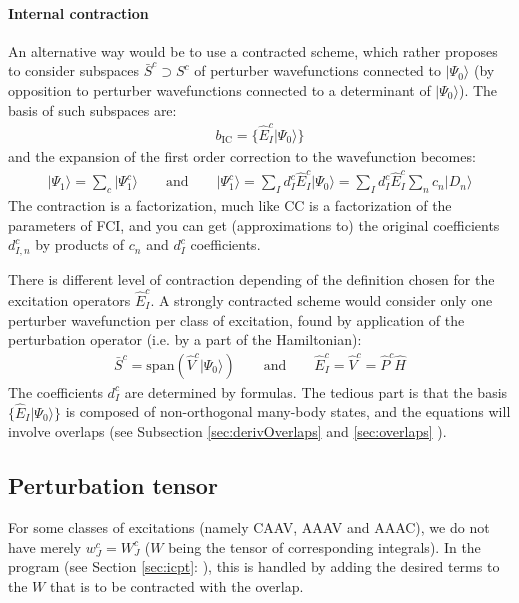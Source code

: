 \documentclass{article}
\newcommand  \equ[2]       {\begin{align}#2\label{#1}\end{align}}
\newcommand  \ket[1]       {\vert #1  \rangle}
\begin{document}
\paragraph{Internal contraction}
\label{sec:contraction}

An alternative way would be to use a contracted scheme, which rather proposes to consider subspaces $\bar{S}^c\supset S^c$ of perturber wavefunctions connected to $\ket{\Psi_0}$ (by opposition to perturber wavefunctions connected to a determinant of $\ket{\Psi_0}$). The basis of such subspaces are:
\equ{ }{
  b_\text{IC}=\{\hat{E}_{I}^c\ket{\Psi_0}\}
}
and the expansion of the first order correction to the wavefunction becomes:
\equ{}{
  \ket{\Psi_1}=\sum_{c}\ket{\Psi_1^c}\qquad\text{and}\qquad \ket{\Psi_1^c}=\sum_{I } d^c_I \hat{E}^c_{I}\ket{\Psi_0}=\sum_{I } d^c_I \hat{E}^c_{I}\sum_n c_n\ket{D_n}}
The contraction is a factorization, much like CC is a factorization of the parameters of FCI, and you can get (approximations to) the original coefficients $d^c_{I,n} $ by products of $c_n$ and $d^c_I$ coefficients.

There is different level of contraction depending of the definition chosen for the excitation operators $\hat{E}_I^c$. A strongly contracted scheme would consider only one perturber wavefunction per class of excitation, found by application of the perturbation operator (i.e. by a part of the Hamiltonian):
\equ{}{
  \bar{S}^c=\text{span}(\hat{V}^c\ket{\Psi_0})
  \qquad\text{and}\qquad
  \hat{E}^c_I =\hat{V}^c = \hat{P}^c \hat{H}
}
The coefficients $d^c_I$ are determined by formulas.
The tedious part is that the basis $\{\hat{E}_{I }\ket{\Psi_0}\}$ is composed of non-orthogonal many-body states, and the equations will involve overlaps (see Subsection \ref{sec:derivOverlaps}  and \ref{sec:overlaps} ).

\subsection{Perturbation tensor}
\label{sec:Wtensor}

For some classes of excitations (namely CAAV, AAAV and AAAC), we do not have merely $w^c_J =W^c_J $ ($W$ being the tensor of corresponding integrals).
In the program (see Section \ref{sec:icpt}: ), this is handled by adding the desired terms to the $W$ that is to be contracted with the overlap.
\end{document}

